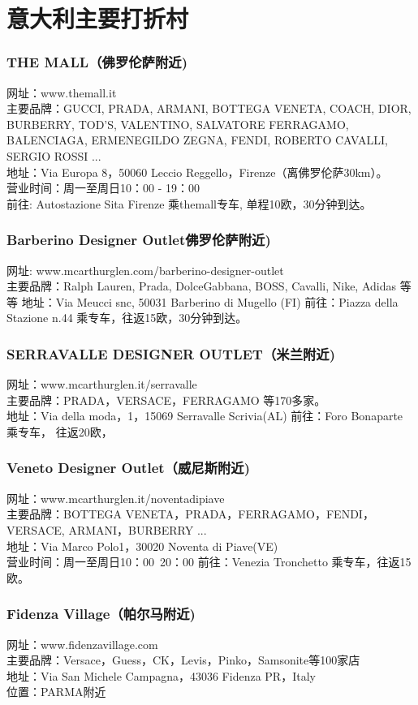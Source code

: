 \section{意大利主要打折村}

\subsubsection{THE MALL（佛罗伦萨附近)}
\noindent 网址：www.themall.it\\
主要品牌：GUCCI, PRADA, ARMANI, BOTTEGA VENETA, COACH, DIOR, BURBERRY, TOD’S, VALENTINO, SALVATORE FERRAGAMO, BALENCIAGA, ERMENEGILDO ZEGNA, FENDI, ROBERTO CAVALLI, SERGIO ROSSI ...\\
地址：Via Europa 8，50060 Leccio Reggello，Firenze（离佛罗伦萨30km）。\\
营业时间：周一至周日10：00 - 19：00 \\
前往: Autostazione Sita Firenze 乘themall专车, 单程10欧，30分钟到达。

\subsubsection{Barberino Designer Outlet佛罗伦萨附近)}
\noindent 网址: www.mcarthurglen.com/barberino-designer-outlet\\
主要品牌：Ralph Lauren, Prada, DolceGabbana, BOSS, Cavalli, Nike, Adidas 等等
地址：Via Meucci snc, 50031 Barberino di Mugello (FI)
前往：Piazza della Stazione n.44 乘专车，往返15欧，30分钟到达。
 
\subsubsection{SERRAVALLE DESIGNER OUTLET（米兰附近)}
\noindent 网址：www.mcarthurglen.it/serravalle\\
主要品牌：PRADA，VERSACE，FERRAGAMO 等170多家。\\
地址：Via della moda，1，15069 Serravalle Scrivia(AL)
前往：Foro Bonaparte 乘专车， 往返20欧，
 
\subsubsection{Veneto Designer Outlet（威尼斯附近)}
\noindent 网址：www.mcarthurglen.it/noventadipiave \\
主要品牌：BOTTEGA VENETA，PRADA，FERRAGAMO，FENDI，VERSACE, ARMANI，BURBERRY ... \\
地址：Via Marco Polo1，30020 Noventa di Piave(VE) \\
营业时间：周一至周日10：00~20：00
前往：Venezia Tronchetto 乘专车，往返15欧。
 
\subsubsection{Fidenza Village（帕尔马附近)}
\noindent 网址：www.fidenzavillage.com\\
主要品牌：Versace，Guess，CK，Levis，Pinko，Samsonite等100家店\\
地址：Via San Michele Campagna，43036 Fidenza PR，Italy\\
位置：PARMA附近